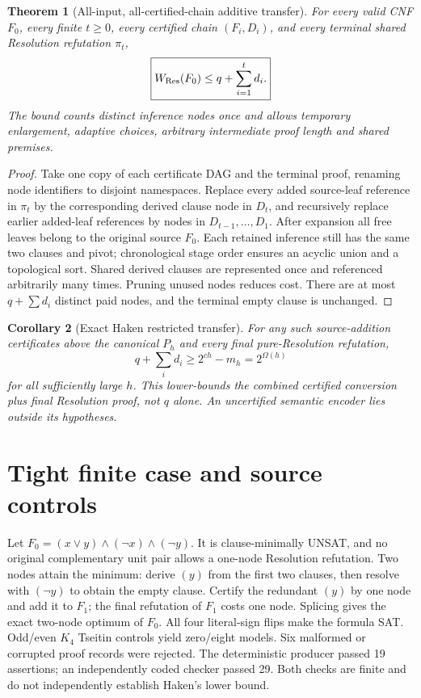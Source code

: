 \documentclass[11pt]{article}
\newtheorem{theorem}{Theorem}
\newtheorem{corollary}[theorem]{Corollary}
\begin{document}
\begin{theorem}[All-input, all-certified-chain additive transfer]
For every valid CNF $F_0$, every finite $t\ge0$, every certified chain $(F_i,D_i)$, and every terminal shared Resolution refutation $\pi_t$,
\[
\boxed{W_{\rm Res}(F_0)\le q+\sum_{i=1}^t d_i.}
\]
The bound counts distinct inference nodes once and allows temporary enlargement, adaptive choices, arbitrary intermediate proof length and shared premises.
\end{theorem}
\begin{proof}
Take one copy of each certificate DAG and the terminal proof, renaming node identifiers to disjoint namespaces. Replace every added source-leaf reference in $\pi_t$ by the corresponding derived clause node in $D_t$, and recursively replace earlier added-leaf references by nodes in $D_{t-1},\ldots,D_1$. After expansion all free leaves belong to the original source $F_0$. Each retained inference still has the same two clauses and pivot; chronological stage order ensures an acyclic union and a topological sort. Shared derived clauses are represented once and referenced arbitrarily many times. Pruning unused nodes reduces cost. There are at most $q+\sum d_i$ distinct paid nodes, and the terminal empty clause is unchanged.
\end{proof}
\begin{corollary}[Exact Haken restricted transfer]
For any such source-addition certificates above the canonical $P_h$ and every final pure-Resolution refutation,
\[
\boxed{q+\sum_i d_i\ge 2^{ch}-m_h=2^{\Omega(h)}}
\]
for all sufficiently large $h$. This lower-bounds the \emph{combined certified conversion plus final Resolution proof}, not $q$ alone. An uncertified semantic encoder lies outside its hypotheses.
\end{corollary}

\section*{Tight finite case and source controls}
Let $F_0=(x\lor y)\land(\neg x)\land(\neg y)$. It is clause-minimally UNSAT, and no original complementary unit pair allows a one-node Resolution refutation. Two nodes attain the minimum: derive $(y)$ from the first two clauses, then resolve with $(\neg y)$ to obtain the empty clause. Certify the redundant $(y)$ by one node and add it to $F_1$; the final refutation of $F_1$ costs one node. Splicing gives the exact two-node optimum of $F_0$. All four literal-sign flips make the formula SAT. Odd/even $K_4$ Tseitin controls yield zero/eight models. Six malformed or corrupted proof records were rejected. The deterministic producer passed 19 assertions; an independently coded checker passed 29. Both checks are finite and do not independently establish Haken's lower bound.
\end{document}
